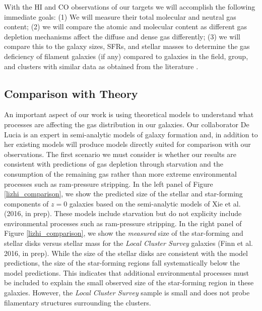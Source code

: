 \documentclass[11pt, preprint]{aastex}
\begin{document}
{With the HI and CO observations of our targets we will accomplish the following immediate goals: 
(1) We will measure their total molecular and neutral gas content; (2)
we will compare the atomic and molecular content as different gas
depletion mechanisms affect the diffuse and dense gas differently; (3)
we will compare this to the galaxy sizes, SFRs, and stellar masses to
determine the gas deficiency of filament galaxies (if any) compared to
galaxies in the field, group, and clusters with similar data as
obtained from the literature 
\citep[e.g.][]{Ciesla12, davies10}.



\vspace*{-1cm}
\subsection{Comparison with Theory}
\vspace*{-.4cm}

An important aspect of our work is using theoretical models to understand what processes are affecting the gas distribution in our galaxies.  Our collaborator De Lucia is an expert in semi-analytic models of galaxy formation and, in addition to her existing models \citep{Zoldan16} will produce models directly suited for comparison with our observations.  The first scenario we must consider is whether our results are
consistent with predictions of gas depletion through starvation and
the consumption of the remaining gas
rather than more extreme environmental processes such as ram-pressure stripping.
In the left panel of Figure \ref{lizhi_comparison}, we show the predicted size of the
stellar and star-forming components of $z = 0$ galaxies based on the
semi-analytic models of Xie et al. (2016, in prep).  These models
include starvation but do not explicity include environmental
processes such as ram-pressure stripping.  In the right panel of
Figure \ref{lizhi_comparison}, we show the {\it measured} size of the
star-forming and stellar disks versus stellar mass for the {\it Local
  Cluster Survey} galaxies (Finn et al. 2016, in prep).  While the size of the stellar disks are
consistent with the model predictions, the size of the star-forming
regions fall systematically below the model predictions.  This
indicates that additional environmental processes must be included to
explain the small observed size of the star-forming region in these
galaxies.  However, the {\it Local Cluster Survey} sample is small and does not probe filamentary structures surrounding the clusters.


}
\end{document}
